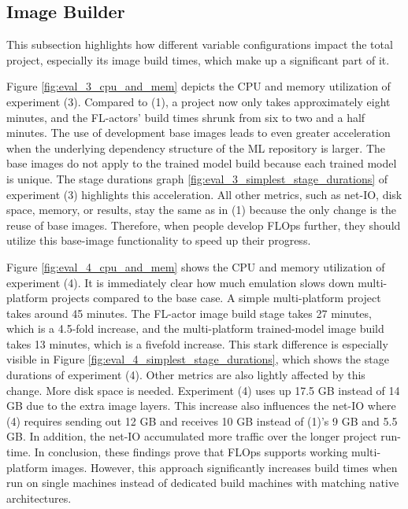 \subsection{Image Builder} \label{subsection:eval_image_builder}

This subsection highlights how different variable configurations impact the total project, especially its image build times, which make up a significant part of it.

Figure \ref{fig:eval_3_cpu_and_mem} depicts the CPU and memory utilization of experiment (3).
Compared to (1), a project now only takes approximately eight minutes, and the FL-actors' build times shrunk from six to two and a half minutes.
The use of development base images leads to even greater acceleration when the underlying dependency structure of the ML repository is larger.
The base images do not apply to the trained model build because each trained model is unique.
The stage durations graph \ref{fig:eval_3_simplest_stage_durations} of experiment (3) highlights this acceleration.
All other metrics, such as net-IO, disk space, memory, or results, stay the same as in (1) because the only change is the reuse of base images.
Therefore, when people develop FLOps further, they should utilize this base-image functionality to speed up their progress.

Figure \ref{fig:eval_4_cpu_and_mem} shows the CPU and memory utilization of experiment (4).
It is immediately clear how much emulation slows down multi-platform projects compared to the base case.
A simple multi-platform project takes around 45 minutes.
The FL-actor image build stage takes 27 minutes, which is a 4.5-fold increase, and the multi-platform trained-model image build takes 13 minutes, which is a fivefold increase.
This stark difference is especially visible in Figure \ref{fig:eval_4_simplest_stage_durations}, which shows the stage durations of experiment (4).
Other metrics are also lightly affected by this change.
More disk space is needed. 
Experiment (4) uses up 17.5 GB instead of 14 GB due to the extra image layers.
This increase also influences the net-IO where (4) requires sending out 12 GB and receives 10 GB instead of (1)'s 9 GB and 5.5 GB.
In addition, the net-IO accumulated more traffic over the longer project run-time.
In conclusion, these findings prove that FLOps supports working multi-platform images.
However, this approach significantly increases build times when run on single machines instead of dedicated build machines with matching native architectures.

